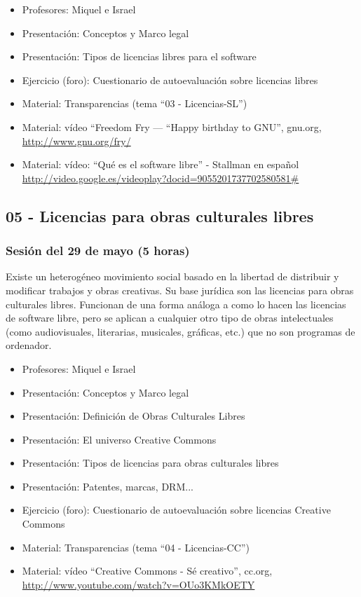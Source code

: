 \documentclass[a4paper,12pt]{article}
\begin{document}
 \begin{itemize}
 \item Profesores: Miquel e Israel
 \item Presentación: Conceptos y Marco legal 
 \item Presentación: Tipos de licencias libres para el software 
 \item Ejercicio (foro): Cuestionario de autoevaluación sobre licencias libres \\
 \item Material: Transparencias (tema ``03 - Licencias-SL'')
 \item Material: vídeo ``Freedom Fry — “Happy birthday to GNU'', gnu.org, \\
   \url{http://www.gnu.org/fry/}
 \item Material: vídeo: ``Qué es el software libre'' - Stallman en español
\url{http://video.google.es/videoplay?docid=9055201737702580581#}
 \end{itemize}

\subsection{05 - Licencias para obras culturales libres}

\subsubsection{Sesión del 29 de mayo (5 horas)}

Existe un heterogéneo movimiento social basado en la libertad de distribuir y modificar trabajos y obras creativas. Su base jurídica son las licencias para obras culturales libres. Funcionan de una forma análoga a como lo hacen las licencias de software libre, pero se aplican a cualquier otro tipo de obras intelectuales (como audiovisuales, literarias, musicales, gráficas, etc.) que no son programas de ordenador.

 \begin{itemize}
 \item Profesores: Miquel e Israel
 \item Presentación: Conceptos y Marco legal
 \item Presentación: Definición de Obras Culturales Libres 
 \item Presentación: El universo Creative Commons
 \item Presentación: Tipos de licencias para obras culturales libres
 \item Presentación: Patentes, marcas, DRM...
 \item Ejercicio (foro): Cuestionario de autoevaluación sobre licencias Creative Commons \\
 \item Material: Transparencias (tema ``04 - Licencias-CC'')
 \item Material: vídeo ``Creative Commons - Sé creativo'', cc.org, \\
   \url{http://www.youtube.com/watch?v=OUo3KMkOETY}
 \end{itemize}
\end{document}
